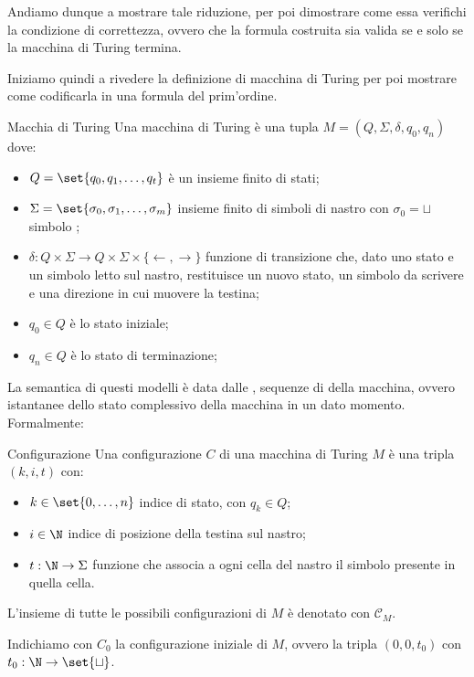 Andiamo dunque a mostrare tale riduzione, per poi dimostrare come essa verifichi la condizione di correttezza, ovvero che la formula costruita sia valida se e solo se la macchina di Turing termina. 

Iniziamo quindi a rivedere la definizione di macchina di Turing per poi mostrare come codificarla in una formula del prim'ordine.

\begin{definition}{Macchia di Turing}
  Una macchina di Turing è una tupla \(M = (Q, \Sigma, \delta, q_0, q_{n})\) dove:
  \begin{itemize}
    \item \(Q = \set{q_0, q_1, \ldots, q_t}\) è un insieme finito di stati;
    \item \(\Sigma = \set{\sigma_0, \sigma_1, \ldots, \sigma_m}\) insieme finito di simboli di nastro con \(\sigma_0 = \sqcup\) simbolo ;
    \item \(\delta: Q \times \Sigma \to Q \times \Sigma \times \{\leftarrow, \rightarrow\}\) funzione di transizione che, dato uno stato e un simbolo letto sul nastro, restituisce un nuovo stato, un simbolo da scrivere e una direzione in cui muovere la testina;
    \item \(q_0 \in Q\) è lo stato iniziale;
    \item \(q_{n} \in Q\) è lo stato di terminazione;
  \end{itemize}
\end{definition}

La semantica di questi modelli è data dalle , sequenze di  della macchina, ovvero istantanee dello stato complessivo della macchina in un dato momento. Formalmente:

\begin{definition}{Configurazione}
  Una configurazione \(C\) di una macchina di Turing \(M\) è una tripla \((k, i,t)\) con:
  \begin{itemize}
    \item \(k \in \set{0,\ldots,n}\) indice di stato, con \(q_k\in Q\);
    \item \(i \in \N\) indice di posizione della testina sul nastro;
    \item \(t: \N \to \Sigma\) funzione che associa a ogni cella del nastro il simbolo presente in quella cella.
  \end{itemize}

  L'insieme di tutte le possibili configurazioni di \(M\) è denotato con \(\mathcal{C}_M\).

  Indichiamo con \(C_0\) la configurazione iniziale di \(M\), ovvero la tripla \((0,0,t_0)\) con \(t_0 : \N \to \set{\sqcup}\).
\end{definition}


